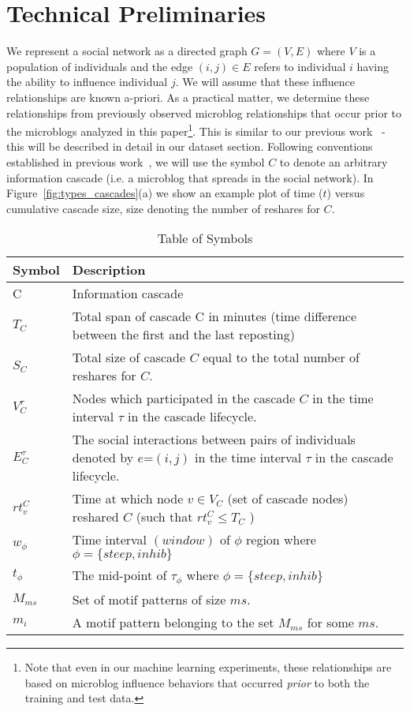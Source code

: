 \documentclass[smallextended]{svjour3}       %
\theoremstyle{definition}
\begin{document}
\section{Technical Preliminaries}
\label{sec:tech_prelim}
We represent a social network as a directed graph $G=(V,E)$ where $V$ is a population of individuals and the edge $(i,j)\in E$ refers to individual $i$ having the ability to influence individual $j$.  We will assume that these influence relationships are known a-priori. As a practical matter, we determine these relationships from previously observed microblog relationships that occur prior to the microblogs analyzed in this paper\footnote{Note that even in our machine learning experiments, these relationships are based on microblog influence behaviors that occurred \textit{prior} to both the training and test data.}.  This is similar to our previous work~\cite{guo_cascade} - this will be described in detail in our dataset section.  Following conventions established in previous work~\cite{guo_cascade}\cite{burst_time}\cite{leskovic_bib}, we will use the symbol $C$ to denote an arbitrary information cascade (i.e. a microblog that  spreads in the social network). In Figure~\ref{fig:types_cascades}(a) we show an example plot of time ($t$) versus cumulative cascade size, size denoting the number of reshares for $C$.  

\begin{table}[!t]
	\centering
	\renewcommand{\arraystretch}{1}
	\caption{Table of Symbols}
	\begin{tabular}{|p{2cm}|p{10cm}|}
		\hline 
		{\bf Symbol} & {\bf Description}\\ 
		\hline\hline
		C           & Information cascade \\
		\hline
		$T_C $ & Total span of cascade C in minutes (time difference between the first and the last reposting)
		\\
		\hline
		$S_C $ & Total size of cascade $C$ equal to the total number of reshares for $C$.
		\\
		\hline
		$V^{\tau}_C $ & Nodes which participated in the cascade $C $  in the time interval $\tau$ in the cascade lifecycle. \\
		\hline
		$E^{\tau}_C$ & The social interactions between pairs of individuals denoted by $e$=$(i,j)$ in the time interval $\tau$ in the cascade lifecycle. \\
		\hline
		$rt_{v}^C $ & Time at which node $v \in V_C $ (set of cascade nodes) reshared $C $ (such that $rt_{v}^C \leq T_C $ )    \\    
		\hline 
		$w_{\phi} $ & Time interval $(window)$ of $\phi $ region where $\phi = \{ steep, inhib \} $
		\\
		\hline
		$t_{\phi} $ & The mid-point of $\tau_{\phi} $ where $\phi = \{ steep, inhib \} $
		\\
		\hline
		$M_{ms}$ & Set of motif patterns of size $ms$.
		\\
		\hline
		$m_{i}$ & A motif pattern belonging to the set $M_{ms}$  for some $ms$.
		\\
		\hline
	\end{tabular}
	\label{tab:table0}
\end{table}
 
\end{document}
